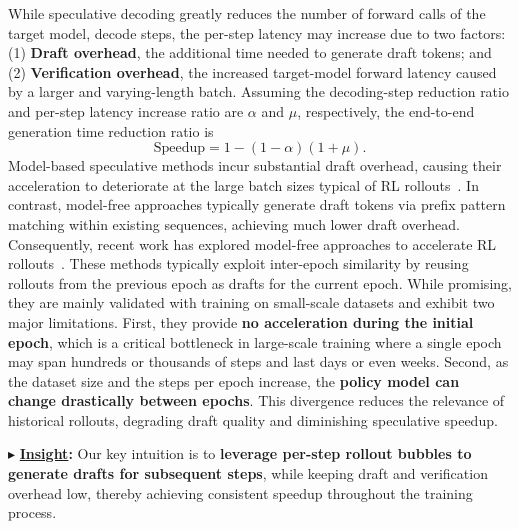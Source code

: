 While speculative decoding greatly reduces the number of forward calls of the target model, \ie decode steps, the per-step latency may increase due to two factors: (1) \textbf{Draft overhead}, the additional time needed to generate draft tokens; and (2) \textbf{Verification overhead}, the increased target-model forward latency caused by a larger and varying-length batch. Assuming the decoding-step reduction ratio and per-step latency increase ratio are $\alpha$ and $\mu$, respectively, the end-to-end generation time reduction ratio is
% 
\begin{equation}
\text{Speedup} = 1 - (1-\alpha)(1+\mu).
\end{equation}
% 
Model-based speculative methods incur substantial draft overhead, causing their acceleration to deteriorate at the large batch sizes typical of RL rollouts~\cite{li2025eagle3}. In contrast, model-free approaches typically generate draft tokens via prefix pattern matching within existing sequences, achieving much lower draft overhead.
Consequently, recent work has explored model-free approaches to accelerate RL rollouts~\cite{he2025history_rhyme, liu2025specRL}. These methods typically exploit inter-epoch similarity by reusing rollouts from the previous epoch as drafts for the current epoch. While promising, they are mainly validated with training on small-scale datasets and exhibit two major limitations. 
First, they provide \textbf{no acceleration during the initial epoch}, which is a critical bottleneck in large-scale training where a single epoch may span hundreds or thousands of steps and last days or even weeks. 
Second, as the dataset size and the steps per epoch increase, the \textbf{policy model can change drastically between epochs}. 
This divergence reduces the relevance of historical rollouts, degrading draft quality and diminishing speculative speedup.

\noindent $\blacktriangleright$ \textbf{\underline{Insight}:} 
Our key intuition is to \textbf{leverage per-step rollout bubbles to generate drafts for subsequent steps}, while keeping draft and verification overhead low, thereby achieving consistent speedup throughout the training process.
